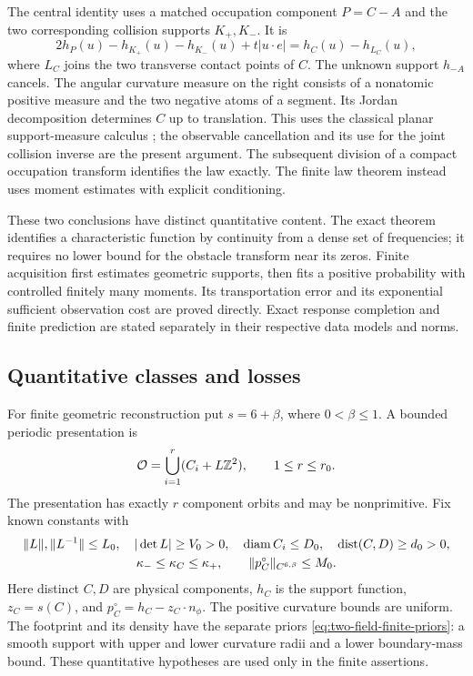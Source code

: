 The central identity uses a matched occupation component $P=C-A$
and the two corresponding collision supports $K_+,K_-$. It is
\[
  2h_P(u)-h_{K_+}(u)-h_{K_-}(u)+t|u\cdot e|=h_C(u)-h_{L_C}(u),
\]
where $L_C$ joins the two transverse contact points of $C$. The
unknown support $h_{-A}$ cancels. The angular curvature measure on
the right consists of a nonatomic positive measure and the two
negative atoms of a segment. Its Jordan decomposition determines
$C$ up to translation. This uses the classical planar support-measure
calculus \cite{Schneider,MartinezMaure}; the observable cancellation
and its use for the joint collision inverse are the present argument.
The subsequent division of a compact occupation transform identifies
the law exactly. The finite law theorem instead uses moment estimates
with explicit conditioning.

These two conclusions have distinct quantitative content. The exact
theorem identifies a characteristic function by continuity from a
dense set of frequencies; it requires no lower bound for the obstacle
transform near its zeros. Finite acquisition first estimates geometric
supports, then fits a positive probability with controlled finitely
many moments. Its transportation error and its exponential sufficient
observation cost are proved directly. Exact response completion and
finite prediction are stated separately in their respective data
models and norms.

\subsection{Quantitative classes and losses}
For finite geometric reconstruction put $s=6+\beta$, where
$0<\beta\le1$. A bounded periodic presentation is
\begin{equation}\label{eq:two-field-presentation}
 \mathcal O=\bigcup_{i=1}^r(C_i+L\mathbb Z^2),\qquad 1\le r\le r_0.
\end{equation}
The presentation has exactly $r$ component orbits and may be
nonprimitive. Fix known constants with
\begin{equation}\label{eq:two-field-geometric-priors}
 \begin{gathered}
 \|L\|,\|L^{-1}\|\le L_0,\quad |\det L|\ge V_0>0,\quad
 \operatorname{diam} C_i\le D_0,\quad \operatorname{dist}(C,D)\ge d_0>0,\\
 \kappa_-\le\kappa_C\le\kappa_+,\qquad
                 \|p_C^\circ\|_{C^{6,\beta}}\le M_0.
 \end{gathered}
\end{equation}
Here distinct $C,D$ are physical components, $h_C$ is the support
function, $z_C=s(C)$, and $p_C^\circ=h_C-z_C\cdot n_\phi$.
The positive curvature bounds are uniform. The footprint and its
density have the separate priors
\eqref{eq:two-field-finite-priors}: a smooth support with upper and
lower curvature radii and a lower boundary-mass bound. These
quantitative hypotheses are used only in the finite assertions.

